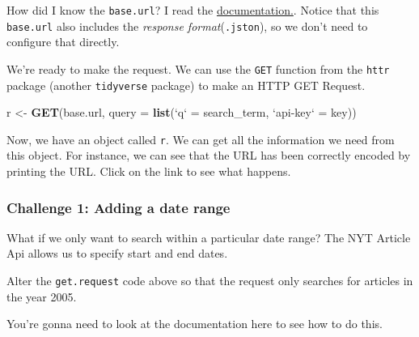 \documentclass[]{book}
\newenvironment{Shaded}{\begin{snugshade}}{\end{snugshade}}
\newcommand{\CommentTok}[1]{\textcolor[rgb]{0.56,0.35,0.01}{\textit{#1}}}
\newcommand{\DataTypeTok}[1]{\textcolor[rgb]{0.13,0.29,0.53}{#1}}
\newcommand{\KeywordTok}[1]{\textcolor[rgb]{0.13,0.29,0.53}{\textbf{#1}}}
\newcommand{\NormalTok}[1]{#1}
\newcommand{\OperatorTok}[1]{\textcolor[rgb]{0.81,0.36,0.00}{\textbf{#1}}}
\newcommand{\StringTok}[1]{\textcolor[rgb]{0.31,0.60,0.02}{#1}}
\begin{document}
How did I know the \texttt{base.url}? I read the \href{https://developer.nytimes.com/docs/articlesearch-product/1/routes/articlesearch.json/get}{documentation.}. Notice that this \texttt{base.url} also includes the \emph{response format}(\texttt{.jston}), so we don't need to configure that directly.

We're ready to make the request. We can use the \texttt{GET} function from the \texttt{httr} package (another \texttt{tidyverse} package) to make an HTTP GET Request.

\begin{Shaded}
\begin{Highlighting}[]
\NormalTok{r <-}\StringTok{ }\KeywordTok{GET}\NormalTok{(base.url, }\DataTypeTok{query =} \KeywordTok{list}\NormalTok{(}\StringTok{`}\DataTypeTok{q}\StringTok{`}\NormalTok{ =}\StringTok{ }\NormalTok{search_term,}
                                \StringTok{`}\DataTypeTok{api-key}\StringTok{`}\NormalTok{ =}\StringTok{ }\NormalTok{key))}
\end{Highlighting}
\end{Shaded}

Now, we have an object called \texttt{r}. We can get all the information we need from this object. For instance, we can see that the URL has been correctly encoded by printing the URL. Click on the link to see what happens.

\begin{Shaded}
\end{Shaded}

\hypertarget{challenge-1-adding-a-date-range}{%
\subsubsection*{Challenge 1: Adding a date range}\label{challenge-1-adding-a-date-range}}

What if we only want to search within a particular date range? The NYT Article Api allows us to specify start and end dates.

Alter the \texttt{get.request} code above so that the request only searches for articles in the year 2005.

You're gonna need to look at the documentation here to see how to do this.
\end{document}
